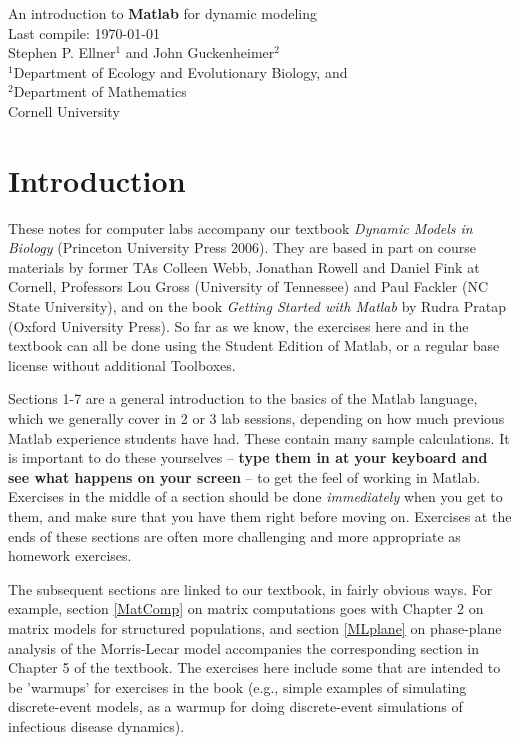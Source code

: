 \documentclass [11pt]{article}
\newcounter{exercise}
\numberwithin{exercise}{section}
\begin{document}
\begin{center} 
\Large An introduction to \textbf{Matlab} for dynamic modeling \\
\normalsize Last compile: \today \\
\vspace{0.25in}
\large  
Stephen P. Ellner$^1$ and John Guckenheimer$^2$\\ 
${}^1$Department of Ecology and Evolutionary Biology, and \\
${}^2$Department of Mathematics \\
Cornell University \\
\normalsize \end{center}

\tableofcontents
\section*{Introduction} 
These notes for computer labs accompany our textbook \textit{Dynamic Models in Biology} (Princeton University
Press 2006). They are based in part on course materials 
by former TAs Colleen Webb, Jonathan Rowell and Daniel Fink at Cornell, 
Professors Lou Gross (University of Tennessee) and Paul Fackler (NC State University), and 
on the book \textit{Getting Started with Matlab} by Rudra Pratap (Oxford University Press). 
So far as we know, the exercises here and in the textbook can all be done using 
the Student Edition of Matlab, or a regular base license without additional
Toolboxes. 

Sections 1-7 are a general introduction to the basics of the Matlab language,
which we generally cover in 2 or 3 lab sessions, depending on how much previous
Matlab experience students have had. 
These contain many sample calculations. It is important to 
do these yourselves -- \textbf{type them in at your keyboard and see what
happens on your screen} -- to get the feel of working in Matlab. 
Exercises in the middle of a section should be done \textit{immediately} when you 
get to them, and make sure that you have them right 
before moving on. Exercises at the ends of these sections are often more
challenging and more appropriate as homework exercises. 

The subsequent sections are linked to our textbook, in fairly obvious ways. For example,
section \ref{MatComp} on matrix computations goes with Chapter 2 on matrix models for
structured populations, and section \ref{MLplane} on phase-plane analysis of the
Morris-Lecar model accompanies the corresponding section in Chapter 5 of the
textbook. The exercises here include some that are intended to be 'warmups' for
exercises in the book (e.g., simple examples of simulating discrete-event
models, as a warmup for doing discrete-event simulations of infectious disease
dynamics). 
\end{document}
